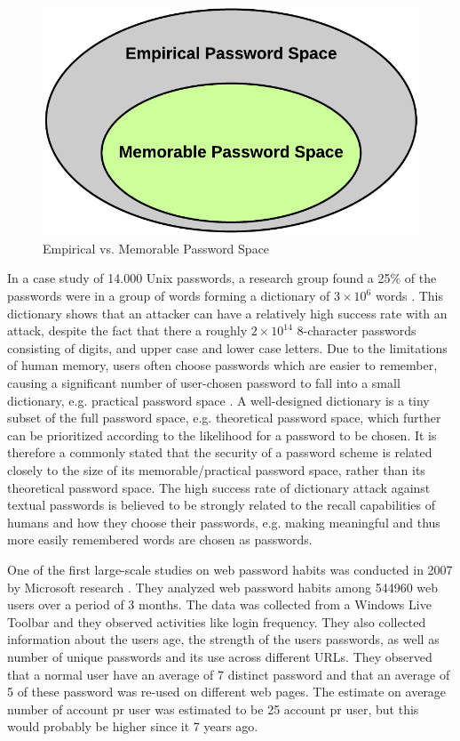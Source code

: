   \begin{figure}[H]
      \centering
      \includegraphics[scale=0.25]{pics/EmpiricalVsPractical.png}
      \caption{Empirical vs. Memorable Password Space}
      \label{fig:memorable}
    \end{figure}

  In a case study of 14.000 Unix passwords, a research group found a 25\% of the passwords were in a group of words forming a dictionary of $3\times10^{6}$ words \cite{UnixPasswords}. This dictionary shows that an attacker can have a relatively high success rate with an attack, despite the fact that there a roughly $2\times10^{14}$ 8-character passwords consisting of digits, and upper case and lower case letters. Due to the limitations of human memory, users often choose passwords which are easier to remember, causing a significant number of user-chosen password to fall into a small dictionary, e.g. practical password space \cite{Tao}. A well-designed dictionary is a tiny subset of the full password space, e.g. theoretical password space, which further can be prioritized  according to the likelihood for a password to be chosen. It is therefore a commonly stated that the security of a password scheme is related closely to the size of its memorable/practical password space, rather than its theoretical password space. The high success rate of dictionary attack against textual passwords is believed to be strongly related to the recall capabilities of humans and how they choose their passwords, e.g. making meaningful and thus more easily remembered words are chosen as passwords. 

  One of the first large-scale studies on web password habits was conducted in 2007 by Microsoft research \cite{habits1}. They analyzed web password habits among 544960 web users over a period of 3 months. The data was collected from a Windows Live Toolbar and they observed activities like login frequency. They also collected information about the users age, the strength of the users passwords, as well as number of unique passwords and its use across different URLs. They observed that a normal user have an average of 7 distinct password and that an average of 5 of these password was re-used on different web pages. The estimate on average number of account pr user was estimated to be 25 account pr user, but this would probably be higher since it 7 years ago. 

